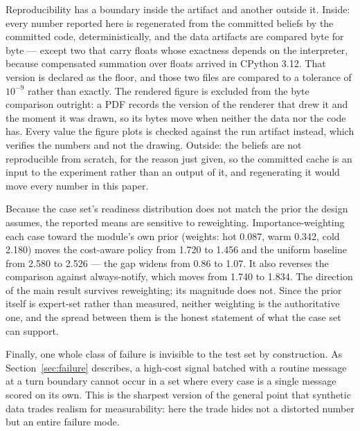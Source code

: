 \documentclass{article}
\begin{document}
Reproducibility has a boundary inside the artifact and another outside it. Inside:
every number reported here is regenerated from the committed beliefs by the
committed code, deterministically, and the data artifacts are compared byte for
byte --- except two that carry floats whose exactness depends on the interpreter,
because compensated summation over floats arrived in CPython 3.12. That version is
declared as the floor, and those two files are compared to a tolerance of
$10^{-9}$ rather than exactly. The rendered figure is excluded from the byte
comparison outright: a PDF records the version of the renderer that drew it and the
moment it was drawn, so its bytes move when neither the data nor the code has.
Every value the figure plots is checked against the run artifact instead, which
verifies the numbers and not the drawing. Outside: the beliefs are not reproducible
from scratch, for the reason just given, so the committed cache is an input to the
experiment rather than an output of it, and regenerating it would move every number
in this paper.

Because the case set's readiness distribution does not match the prior the design
assumes, the reported means are sensitive to reweighting. Importance-weighting each
case toward the module's own prior (weights: hot 0.087, warm 0.342, cold 2.180)
moves the cost-aware policy from 1.720 to 1.456 and the uniform baseline from 2.580
to 2.526 --- the gap widens from 0.86 to 1.07. It also reverses the comparison
against always-notify, which moves from 1.740 to 1.834. The direction of the main
result survives reweighting; its magnitude does not. Since the prior itself is
expert-set rather than measured, neither weighting is the authoritative one, and the
spread between them is the honest statement of what the case set can support.

Finally, one whole class of failure is invisible to the test set by construction.
As Section~\ref{sec:failure} describes, a high-cost signal batched with a routine
message at a turn boundary cannot occur in a set where every case is a single
message scored on its own. This is the sharpest version of the general point that
synthetic data trades realism for measurability: here the trade hides not a
distorted number but an entire failure mode.
\end{document}
